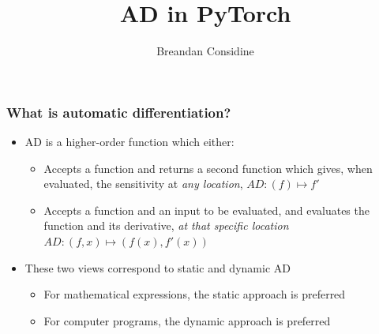 \documentclass{beamer}
\title{AD in PyTorch}
\author{Breandan Considine}
\begin{document}
    \frame{\titlepage}

    \begin{frame}
        \frametitle{What is automatic differentiation?}
        \begin{itemize}
            \item AD is a higher-order function which either:
            \begin{itemize}
            \item Accepts a function and returns a second function which gives, when evaluated, the sensitivity at \textit{any location}, $AD: (f) \mapsto f'$
            \item Accepts a function and an input to be evaluated, and evaluates the function and its derivative, \textit{at that specific location} $AD: (f, x) \mapsto (f(x), f'(x))$
            \end{itemize}
            \item These two views correspond to static and dynamic AD
            \begin{itemize}
            \item For mathematical expressions, the static approach is preferred
            \item For computer programs, the dynamic approach is preferred
            \end{itemize}
        \end{itemize}
    \end{frame}
\end{document}
